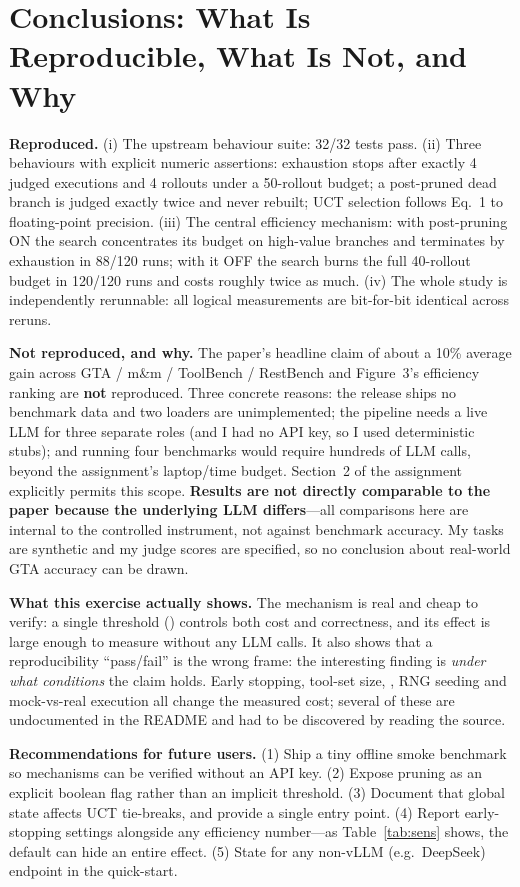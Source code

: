 \documentclass[11pt,letterpaper]{article}
\newcommand{\code}[1]{\texttt{\detokenize{#1}}}
\begin{document}
\section{Conclusions: What Is Reproducible, What Is Not, and Why}

\textbf{Reproduced.} (i) The upstream behaviour suite: 32/32 tests pass.
(ii) Three behaviours with explicit numeric assertions: exhaustion stops after
exactly 4 judged executions and 4 rollouts under a 50-rollout budget; a
post-pruned dead branch is judged exactly twice and never rebuilt; UCT selection
follows Eq.~1 to floating-point precision. (iii) The central efficiency
mechanism: with post-pruning ON the search concentrates its budget on high-value
branches and terminates by exhaustion in 88/120 runs; with it OFF the search
burns the full 40-rollout budget in 120/120 runs and costs roughly twice as
much. (iv) The whole study is independently rerunnable: all logical measurements
are bit-for-bit identical across reruns.

\textbf{Not reproduced, and why.} The paper's headline claim of about a 10\%
average gain across GTA / m\&m / ToolBench / RestBench and Figure~3's efficiency
ranking are \textbf{not} reproduced. Three concrete reasons: the release ships no
benchmark data and two loaders are unimplemented; the pipeline needs a live LLM
for three separate roles (and I had no API key, so I used deterministic stubs);
and running four benchmarks would require hundreds of LLM calls, beyond the
assignment's laptop/time budget. Section~2 of the assignment explicitly permits
this scope. \textbf{Results are not directly comparable to the paper because the
underlying LLM differs}---all comparisons here are internal to the controlled
instrument, not against benchmark accuracy. My tasks are synthetic and my judge
scores are specified, so no conclusion about real-world GTA accuracy can be drawn.

\textbf{What this exercise actually shows.} The mechanism is real and cheap to
verify: a single threshold (\code{tau_post}) controls both cost and correctness,
and its effect is large enough to measure without any LLM calls. It also shows
that a reproducibility ``pass/fail'' is the wrong frame: the interesting finding
is \emph{under what conditions} the claim holds. Early stopping, tool-set size,
\code{top_k}, RNG seeding and mock-vs-real execution all change the measured
cost; several of these are undocumented in the README and had to be discovered
by reading the source.

\textbf{Recommendations for future users.} (1) Ship a tiny offline smoke
benchmark so mechanisms can be verified without an API key. (2) Expose pruning
as an explicit boolean flag rather than an implicit threshold. (3) Document that
global \code{random} state affects UCT tie-breaks, and provide a single
\code{seed} entry point. (4) Report early-stopping settings alongside any
efficiency number---as Table~\ref{tab:sens} shows, the default can hide an entire
effect. (5) State \code{enable_thinking_toggle: false} for any non-vLLM
(e.g.\ DeepSeek) endpoint in the quick-start.
\end{document}
